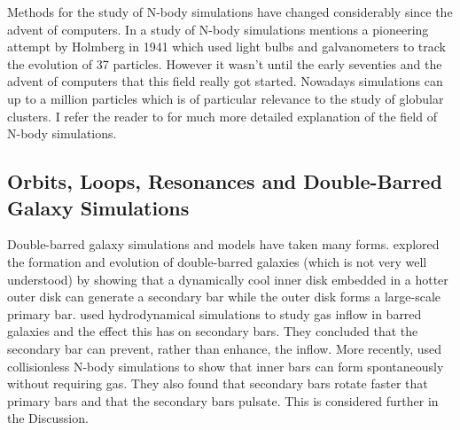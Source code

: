 \documentclass[a4paper,12pt]{article}
\begin{document}
Methods for the study of N-body simulations have changed considerably since the advent of computers. In a study of N-body simulations \cite{trenti} mentions a pioneering attempt by Holmberg in 1941 which used 
light bulbs and galvanometers to track the evolution of 37 particles. However it wasn't until the early seventies and the advent of computers that this field really got started. 
Nowadays simulations can up to a million particles \citep{heggie} which is of particular relevance to the study of globular
clusters. I refer the reader to \cite{aarseth} for much more detailed explanation of the field of N-body simulations.

\subsection{Orbits, Loops, Resonances and Double-Barred Galaxy Simulations}
Double-barred galaxy simulations and models have taken many forms. \cite{du1} explored the formation and evolution of double-barred galaxies (which is not very well understood) by showing that a dynamically
cool inner disk embedded in a hotter outer disk can generate a secondary bar while the outer disk forms a large-scale primary bar. \cite{macie8} used hydrodynamical simulations to study gas inflow in barred galaxies
and the effect this has on secondary bars. They concluded that the secondary bar can prevent, rather than enhance, the inflow. More recently, \cite{debattista} used collisionless N-body simulations to show
that inner bars can form spontaneously without requiring gas. They also found that secondary bars rotate faster that primary bars and that the secondary bars pulsate. This is considered further in the Discussion.
\end{document}
